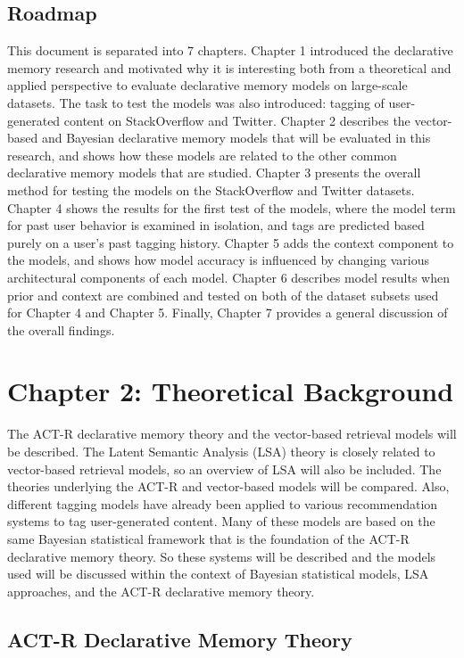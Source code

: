 \documentclass[man,floatsintext,donotrepeattitle]{apa6}
\begin{document}
\subsection{Roadmap}

This document is separated into 7 chapters.
Chapter 1 introduced the declarative memory research and motivated why it is interesting both from a theoretical and applied perspective to evaluate declarative memory models on large-scale datasets.
The task to test the models was also introduced: tagging of user-generated content on StackOverflow and Twitter.
Chapter 2 describes the vector-based and Bayesian declarative memory models that will be evaluated in this research, and shows how these models are related to the other common declarative memory models that are studied.
Chapter 3 presents the overall method for testing the models on the StackOverflow and Twitter datasets.
Chapter 4 shows the results for the first test of the models, where the model term for past user behavior is examined in isolation, and tags are predicted based purely on a user's past tagging history.
Chapter 5 adds the context component to the models, and shows how model accuracy is influenced by changing various architectural components of each model.
Chapter 6 describes model results when prior and context are combined and tested on both of the dataset subsets used for Chapter 4 and Chapter 5.
Finally, Chapter 7 provides a general discussion of the overall findings.

\clearpage
\section{Chapter 2: Theoretical Background}

The ACT-R declarative memory theory and the vector-based retrieval models will be described.
The Latent Semantic Analysis (LSA) theory is closely related to vector-based retrieval models, so an overview of LSA will also be included.
The theories underlying the ACT-R and vector-based models will be compared.
Also, different tagging models have already been applied to various recommendation systems to tag user-generated content.
Many of these models are based on the same Bayesian statistical framework that is the foundation of the ACT-R declarative memory theory.
So these systems will be described and the models used will be discussed within the context of Bayesian statistical models, LSA approaches, and the ACT-R declarative memory theory. 

\subsection{ACT-R Declarative Memory Theory}
\end{document}
